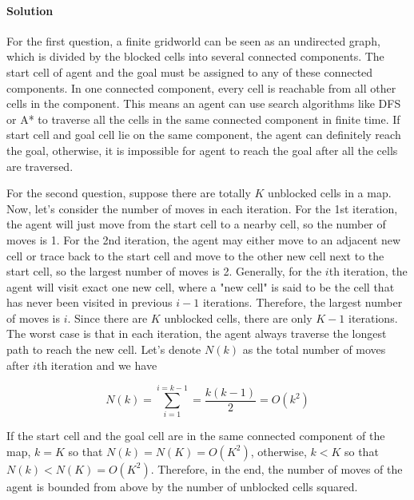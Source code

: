 \paragraph{Solution}
For the first question, a finite gridworld can be seen as an undirected graph,
which is divided by the blocked cells into several connected components. The
start cell of agent and the goal must be assigned to any of these connected
components. In one connected component, every cell is reachable from all other
cells in the component. This means an agent can use search algorithms like DFS
or A* to traverse all the cells in the same connected component in finite time.
If start cell and goal cell lie on the same component, the agent can definitely
reach the goal, otherwise, it is impossible for agent to reach the goal after
all the cells are traversed.

For the second question, suppose there are totally $K$ unblocked cells in a
map. Now, let's consider the number of moves in each iteration. For the 1st
iteration, the agent will just move from the start cell to a nearby cell, so
the number of moves is 1. For the 2nd iteration, the agent may either move to
an adjacent new cell or trace back to the start cell and move to the other new
cell next to the start cell, so the largest number of moves is 2. Generally,
for the $i$th iteration, the agent will visit exact one new cell, where a "new
cell" is said to be the cell that has never been visited in previous $i-1$
iterations. Therefore, the largest number of moves is $i$. Since there are
$K$ unblocked cells, there are only $K-1$ iterations. The worst case is that
in each iteration, the agent always traverse the longest path to reach the new
cell. Let's denote $N(k)$ as the total number of moves after $i$th iteration 
and we have

\begin{equation*}
  N(k)=\sum_{i=1}^{i=k-1}=\frac{k(k-1)}{2}=O(k^2)
\end{equation*}

If the start cell and the goal cell are in the same connected component of the
map, $k=K$ so that $N(k)=N(K)=O(K^2)$, otherwise, $k<K$ so that
$N(k)<N(K)=O(K^2)$.  Therefore, in the end, the number of moves of the agent is
bounded from above by the number of unblocked cells squared.
